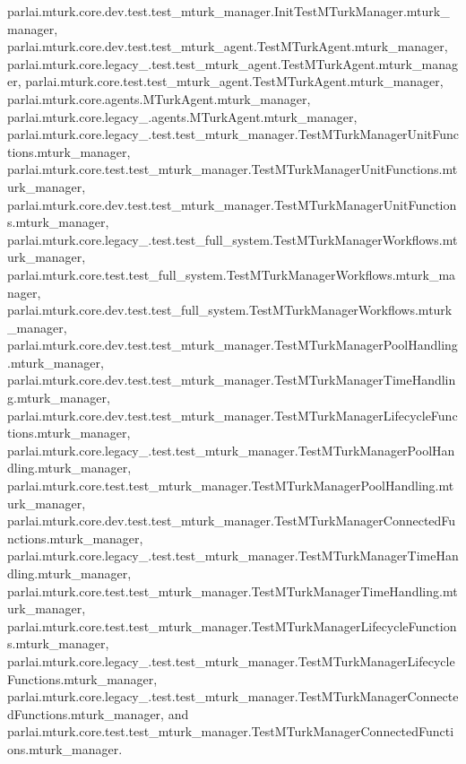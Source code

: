 parlai.\+mturk.\+core.\+dev.\+test.\+test\+\_\+mturk\+\_\+manager.\+Init\+Test\+M\+Turk\+Manager.\+mturk\+\_\+manager, parlai.\+mturk.\+core.\+dev.\+test.\+test\+\_\+mturk\+\_\+agent.\+Test\+M\+Turk\+Agent.\+mturk\+\_\+manager, parlai.\+mturk.\+core.\+legacy\+\_.\+test.\+test\+\_\+mturk\+\_\+agent.\+Test\+M\+Turk\+Agent.\+mturk\+\_\+manager, parlai.\+mturk.\+core.\+test.\+test\+\_\+mturk\+\_\+agent.\+Test\+M\+Turk\+Agent.\+mturk\+\_\+manager, parlai.\+mturk.\+core.\+agents.\+M\+Turk\+Agent.\+mturk\+\_\+manager, parlai.\+mturk.\+core.\+legacy\+\_.\+agents.\+M\+Turk\+Agent.\+mturk\+\_\+manager, parlai.\+mturk.\+core.\+legacy\+\_.\+test.\+test\+\_\+mturk\+\_\+manager.\+Test\+M\+Turk\+Manager\+Unit\+Functions.\+mturk\+\_\+manager, parlai.\+mturk.\+core.\+test.\+test\+\_\+mturk\+\_\+manager.\+Test\+M\+Turk\+Manager\+Unit\+Functions.\+mturk\+\_\+manager, parlai.\+mturk.\+core.\+dev.\+test.\+test\+\_\+mturk\+\_\+manager.\+Test\+M\+Turk\+Manager\+Unit\+Functions.\+mturk\+\_\+manager, parlai.\+mturk.\+core.\+legacy\+\_.\+test.\+test\+\_\+full\+\_\+system.\+Test\+M\+Turk\+Manager\+Workflows.\+mturk\+\_\+manager, parlai.\+mturk.\+core.\+test.\+test\+\_\+full\+\_\+system.\+Test\+M\+Turk\+Manager\+Workflows.\+mturk\+\_\+manager, parlai.\+mturk.\+core.\+dev.\+test.\+test\+\_\+full\+\_\+system.\+Test\+M\+Turk\+Manager\+Workflows.\+mturk\+\_\+manager, parlai.\+mturk.\+core.\+dev.\+test.\+test\+\_\+mturk\+\_\+manager.\+Test\+M\+Turk\+Manager\+Pool\+Handling.\+mturk\+\_\+manager, parlai.\+mturk.\+core.\+dev.\+test.\+test\+\_\+mturk\+\_\+manager.\+Test\+M\+Turk\+Manager\+Time\+Handling.\+mturk\+\_\+manager, parlai.\+mturk.\+core.\+dev.\+test.\+test\+\_\+mturk\+\_\+manager.\+Test\+M\+Turk\+Manager\+Lifecycle\+Functions.\+mturk\+\_\+manager, parlai.\+mturk.\+core.\+legacy\+\_.\+test.\+test\+\_\+mturk\+\_\+manager.\+Test\+M\+Turk\+Manager\+Pool\+Handling.\+mturk\+\_\+manager, parlai.\+mturk.\+core.\+test.\+test\+\_\+mturk\+\_\+manager.\+Test\+M\+Turk\+Manager\+Pool\+Handling.\+mturk\+\_\+manager, parlai.\+mturk.\+core.\+dev.\+test.\+test\+\_\+mturk\+\_\+manager.\+Test\+M\+Turk\+Manager\+Connected\+Functions.\+mturk\+\_\+manager, parlai.\+mturk.\+core.\+legacy\+\_.\+test.\+test\+\_\+mturk\+\_\+manager.\+Test\+M\+Turk\+Manager\+Time\+Handling.\+mturk\+\_\+manager, parlai.\+mturk.\+core.\+test.\+test\+\_\+mturk\+\_\+manager.\+Test\+M\+Turk\+Manager\+Time\+Handling.\+mturk\+\_\+manager, parlai.\+mturk.\+core.\+test.\+test\+\_\+mturk\+\_\+manager.\+Test\+M\+Turk\+Manager\+Lifecycle\+Functions.\+mturk\+\_\+manager, parlai.\+mturk.\+core.\+legacy\+\_.\+test.\+test\+\_\+mturk\+\_\+manager.\+Test\+M\+Turk\+Manager\+Lifecycle\+Functions.\+mturk\+\_\+manager, parlai.\+mturk.\+core.\+legacy\+\_.\+test.\+test\+\_\+mturk\+\_\+manager.\+Test\+M\+Turk\+Manager\+Connected\+Functions.\+mturk\+\_\+manager, and parlai.\+mturk.\+core.\+test.\+test\+\_\+mturk\+\_\+manager.\+Test\+M\+Turk\+Manager\+Connected\+Functions.\+mturk\+\_\+manager.

